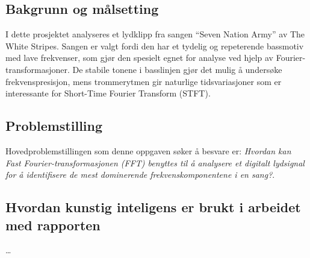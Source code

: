 \subsection{Bakgrunn og målsetting}
I dette prosjektet analyseres et lydklipp fra sangen “Seven Nation Army” av The White Stripes. 
Sangen er valgt fordi den har et tydelig og repeterende bassmotiv med lave frekvenser, som gjør den 
spesielt egnet for analyse ved hjelp av Fourier-transformasjoner. 
De stabile tonene i basslinjen gjør det mulig å undersøke frekvenspresisjon, mens 
trommerytmen gir naturlige tidsvariasjoner som er interessante for Short-Time Fourier Transform (STFT).



\subsection{Problemstilling}
Hovedproblemstillingen som denne oppgaven søker å besvare er:
\textit{Hvordan kan Fast Fourier-transformasjonen (FFT) benyttes til å analysere et digitalt lydsignal for å 
identifisere de mest dominerende frekvenskomponentene i en sang?}.



\subsection{Hvordan kunstig inteligens er brukt i arbeidet med rapporten}
\dots

